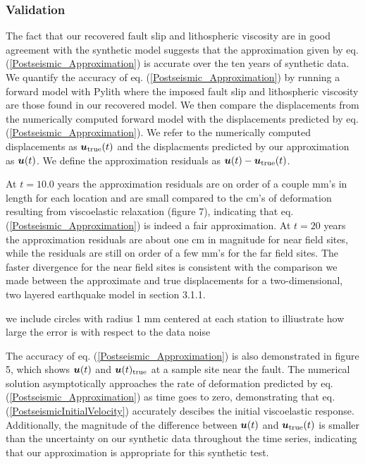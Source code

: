 \documentclass[extra]{gji}
\begin{document}

\subsubsection{Validation}
The fact that our recovered fault slip and lithospheric viscosity are
in good agreement with the synthetic model suggests that the
approximation given by eq. (\ref{Postseismic_Approximation}) is
accurate over the ten years of synthetic data.  We quantify the
accuracy of eq. (\ref{Postseismic_Approximation}) by running a forward
model with Pylith where the imposed fault slip and lithospheric
viscosity are those found in our recovered model.  We then compare the
displacements from the numerically computed forward model with the
displacements predicted by eq. (\ref{Postseismic_Approximation}).  We
refer to the numerically computed displacements as
$\mitbf{u}_{\mathrm{true}}(t)$ and the displacments predicted by our
approximation as $\mitbf{u}(t)$.  We define the approximation residuals
as $\mitbf{u}(t) - \mitbf{u}_{\mathrm{true}}(t)$.

At $t=10.0$ years the approximation residuals are on order of a couple
mm's in length for each location and are small compared to the cm's of
deformation resulting from viscoelastic relaxation (figure 7),
indicating that eq. (\ref{Postseismic_Approximation}) is indeed a fair
approximation.  At $t=20$ years the approximation residuals are about
one cm in magnitude for near field sites, while the residuals are
still on order of a few mm's for the far field sites.  The faster
divergence for the near field sites is consistent with the comparison
we made between the approximate and true displacements for a
two-dimensional, two layered earthquake model in section 3.1.1.

we include circles with radius 1 mm centered at each station to illiustrate
how large the error is with respect to the data noise 

The accuracy of eq. (\ref{Postseismic_Approximation}) is also
demonstrated in figure 5, which shows $\mitbf{u}(t)$ and
$\mitbf{u}(t)_{\mathrm{true}}$ at a sample site near the fault.  The
numerical solution asymptotically approaches the rate of deformation
predicted by eq. (\ref{Postseismic_Approximation}) as time goes to
zero, demonstrating that eq. (\ref{PostseismicInitialVelocity})
accurately descibes the initial viscoelastic response.  Additionally,
the magnitude of the difference between $\mitbf{u}(t)$ and
$\mitbf{u}_{\mathrm{true}}(t)$ is smaller than the uncertainty on our synthetic
data throughout the time series, indicating that our approximation is
appropriate for this synthetic test.
\end{document}
